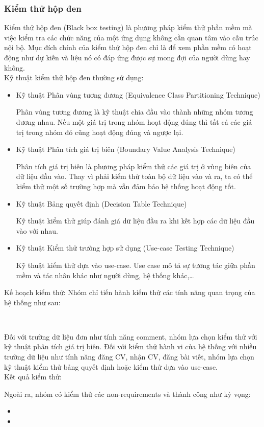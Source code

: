\subsubsection{Kiểm thử hộp đen}
Kiểm thử hộp đen (Black box testing) là phương pháp kiểm thử phần mềm mà việc kiểm tra các chức năng của một ứng dụng không cần quan tâm vào cấu trúc nội bộ. Mục đích chính của kiểm thử hộp đen chỉ là để xem phần mềm có hoạt động như dự kiến và liệu nó có đáp ứng được sự mong đợi của người dùng hay không.\\

Kỹ thuật kiểm thử hộp đen thường sử dụng:

\begin{itemize}
    \item Kỹ thuật Phân vùng tương đương (Equivalence Class Partitioning Technique)

    Phân vùng tương đương là kỹ thuật chia đầu vào thành những nhóm tương đương nhau. Nếu một giá trị trong nhóm hoạt động đúng thì tất cả các giá trị trong nhóm đó cũng hoạt động đúng và ngược lại. 
    \item Kỹ thuật Phân tích giá trị biên (Boundary Value Analysis Technique)

    Phân tích giá trị biên là phương pháp kiểm thử các giá trị ở vùng biên của dữ liệu đầu vào. Thay vì phải kiểm thử toàn bộ dữ liệu vào và ra, ta có thể kiểm thử một số trường hợp mà vẫn đảm bảo hệ thống hoạt động tốt.
    \item Kỹ thuật Bảng quyết định (Decision Table Technique)

    Kỹ thuật kiểm thử giúp đánh giá dữ liệu đầu ra khi kết hợp các dữ liệu đầu vào với nhau.
    \item Kỹ thuật Kiểm thử trường hợp sử dụng (Use-case Testing Technique)

    Kỹ thuật kiểm thử dựa vào use-case. Use case mô tả sự tương tác giữa phần mềm và tác nhân khác như người dùng, hệ thống khác,… 
\end{itemize}

Kế hoạch kiểm thử: Nhóm chỉ tiến hành kiểm thử các tính năng quan trọng của hệ thống như sau:

\begin{itemize}
    \
\end{itemize}

Đối với trường dữ liệu đơn như tính năng comment, nhóm lựa chọn kiểm thử với kỹ thuật phân tích giá trị biên. Đối với kiểm thử hành vi của hệ thống với nhiều trường dữ liệu như tính năng đăng CV, nhận CV, đăng bài viết, nhóm lựa chọn kỹ thuật kiểm thử bảng quyết định hoặc kiểm thử dựa vào use-case.\\

Kết quả kiểm thử: 


Ngoài ra, nhóm có kiểm thử các non-requirements và thành công như kỳ vọng:

\begin{itemize}
    \item 
    \item 

\end{itemize}